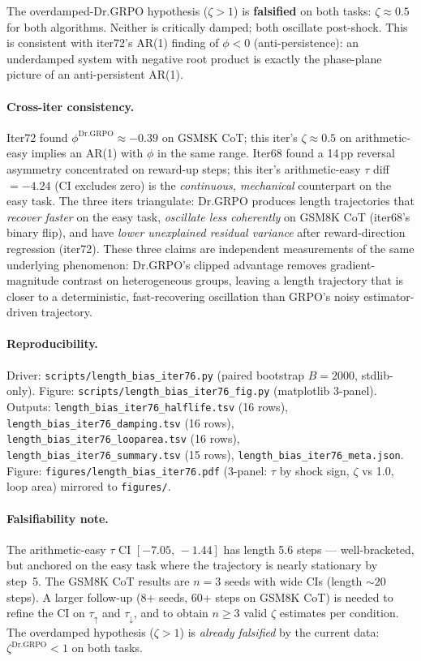 The overdamped-Dr.GRPO hypothesis ($\zeta > 1$) is \textbf{falsified}
on both tasks: $\zeta \approx 0.5$ for both algorithms. Neither is
critically damped; both oscillate post-shock. This is consistent with
iter72's AR(1) finding of $\phi < 0$ (anti-persistence): an
underdamped system with negative root product is exactly the
phase-plane picture of an anti-persistent AR(1).

\paragraph{Cross-iter consistency.}
Iter72 found $\phi^{\mathrm{Dr.GRPO}} \approx -0.39$ on GSM8K CoT;
this iter's $\zeta \approx 0.5$ on arithmetic-easy implies an AR(1)
with $\phi$ in the same range. Iter68 found a 14\,pp reversal
asymmetry concentrated on reward-up steps; this iter's
arithmetic-easy $\tau$ diff $= -4.24$ (CI excludes zero) is the
\emph{continuous, mechanical} counterpart on the easy task. The
three iters triangulate: Dr.GRPO produces length trajectories that
\emph{recover faster} on the easy task, \emph{oscillate less
coherently} on GSM8K CoT (iter68's binary flip), and have
\emph{lower unexplained residual variance} after reward-direction
regression (iter72). These three claims are independent
measurements of the same underlying phenomenon: Dr.GRPO's clipped
advantage removes gradient-magnitude contrast on heterogeneous
groups, leaving a length trajectory that is closer to a
deterministic, fast-recovering oscillation than GRPO's noisy
estimator-driven trajectory.

\paragraph{Reproducibility.}
Driver: \texttt{scripts/length\_bias\_iter76.py} (paired bootstrap
$B = 2000$, stdlib-only). Figure:
\texttt{scripts/length\_bias\_iter76\_fig.py} (matplotlib 3-panel).
Outputs:
\texttt{length\_bias\_iter76\_halflife.tsv} (16 rows),
\texttt{length\_bias\_iter76\_damping.tsv} (16 rows),
\texttt{length\_bias\_iter76\_looparea.tsv} (16 rows),
\texttt{length\_bias\_iter76\_summary.tsv} (15 rows),
\texttt{length\_bias\_iter76\_meta.json}.
Figure: \texttt{figures/length\_bias\_iter76.pdf} (3-panel: $\tau$
by shock sign, $\zeta$ vs 1.0, loop area) mirrored to
\texttt{figures/}.

\paragraph{Falsifiability note.}
The arithmetic-easy $\tau$ CI $[-7.05,\,-1.44]$ has length 5.6
steps --- well-bracketed, but anchored on the easy task where the
trajectory is nearly stationary by step~5. The GSM8K CoT results are
$n = 3$ seeds with wide CIs (length $\sim 20$ steps). A larger
follow-up (8+ seeds, 60+ steps on GSM8K CoT) is needed to refine
the CI on $\tau_{\uparrow}$ and $\tau_{\downarrow}$, and to obtain
$n \ge 3$ valid $\zeta$ estimates per condition. The overdamped
hypothesis ($\zeta > 1$) is \emph{already falsified} by the current
data: $\zeta^{\mathrm{Dr.GRPO}} < 1$ on both tasks.
